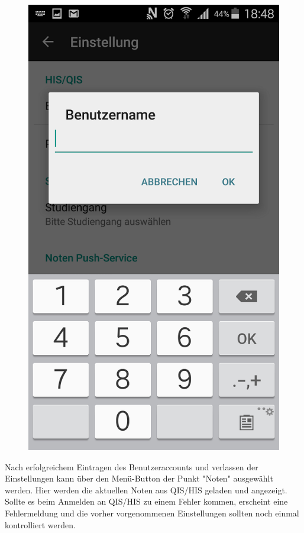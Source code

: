 \begin{figure}[htb]
\begin{minipage}{0.45\linewidth}
        \includegraphics[scale=0.5]{03_Bedienungsanleitung/img/account.png}
    \end{minipage}
\end{figure}

\newpage

Nach erfolgreichem Eintragen des Benutzeraccounts und verlassen der Einstellungen kann über den Menü-Button der Punkt "Noten" ausgewählt werden. Hier werden die aktuellen Noten aus QIS/HIS geladen und angezeigt. Sollte es beim Anmelden an QIS/HIS zu einem Fehler kommen, erscheint eine Fehlermeldung und die vorher vorgenommenen Einstellungen sollten noch einmal kontrolliert werden. 

